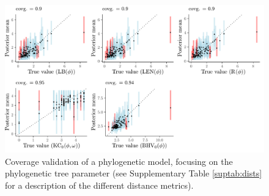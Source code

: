 \documentclass[oneside]{article}
\begin{document}
\begin{figure}
  \centering
  \includegraphics[width=\linewidth]{../figures/tree_stats_coverage_manual.pdf}
   \caption{Coverage validation of a phylogenetic model, focusing on the phylogenetic tree parameter (see Supplementary Table \ref{suptab:dists} for a description of the different distance metrics).}
   \label{supfig:treecov}
 \end{figure}
 
\end{document}
